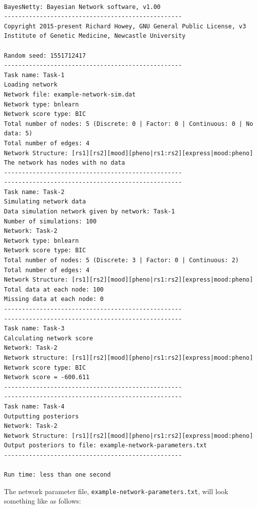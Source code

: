 \documentclass[a4paper,12pt]{article}
\newcommand{\code}[1]{{\footnotesize{{\tt #1}}}}
\begin{document}
\vspace{0.35cm} \begin{lstlisting}

BayesNetty: Bayesian Network software, v1.00
--------------------------------------------------
Copyright 2015-present Richard Howey, GNU General Public License, v3
Institute of Genetic Medicine, Newcastle University

Random seed: 1551712417
--------------------------------------------------
Task name: Task-1
Loading network
Network file: example-network-sim.dat
Network type: bnlearn
Network score type: BIC
Total number of nodes: 5 (Discrete: 0 | Factor: 0 | Continuous: 0 | No data: 5)
Total number of edges: 4
Network Structure: [rs1][rs2][mood][pheno|rs1:rs2][express|mood:pheno]
The network has nodes with no data
--------------------------------------------------
--------------------------------------------------
Task name: Task-2
Simulating network data
Data simulation network given by network: Task-1
Number of simulations: 100
Network: Task-2
Network type: bnlearn
Network score type: BIC
Total number of nodes: 5 (Discrete: 3 | Factor: 0 | Continuous: 2)
Total number of edges: 4
Network Structure: [rs1][rs2][mood][pheno|rs1:rs2][express|mood:pheno]
Total data at each node: 100
Missing data at each node: 0
--------------------------------------------------
--------------------------------------------------
Task name: Task-3
Calculating network score
Network: Task-2
Network structure: [rs1][rs2][mood][pheno|rs1:rs2][express|mood:pheno]
Network score type: BIC
Network score = -600.611
--------------------------------------------------
--------------------------------------------------
Task name: Task-4
Outputting posteriors
Network: Task-2
Network Structure: [rs1][rs2][mood][pheno|rs1:rs2][express|mood:pheno]
Output posteriors to file: example-network-parameters.txt
--------------------------------------------------

Run time: less than one second

\end{lstlisting} \vspace{0.35cm}
The network parameter file, \code{example-network-parameters.txt}, will look something like as follows: 
\end{document}
